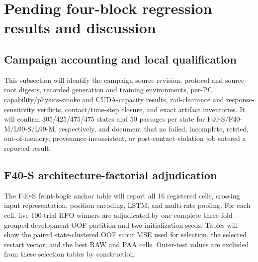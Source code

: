 \section{Pending four-block regression results and discussion}
\label{sec:results}


\subsection{Campaign accounting and local qualification}
\label{sec:accounting}

This subsection will identify the campaign source revision, protocol and
source-root digests, recorded generation and training environments, per-PC
capability/physics-smoke and CUDA-capacity results, rail-clearance and
response-sensitivity verdicts, contact/time-step closure, and exact artifact
inventories. It will
confirm 305/425/475/475 states and 50 passages per state for
F40-S/F40-M/L99-S/L99-M, respectively, and document that no failed, incomplete,
retried, out-of-memory, provenance-inconsistent, or post-contact-violation job
entered a reported result.

\subsection{F40-S architecture-factorial adjudication}
\label{sec:factorial_results}

The F40-S front-bogie anchor table will report all 16 registered cells,
crossing input representation, position encoding, LSTM, and multi-rate pooling. For each
cell, five 100-trial HPO winners are adjudicated by one complete three-fold
grouped-development OOF partition and two initialization seeds. Tables will
show the paired state-clustered OOF scour MSE used for selection, the selected
restart vector, and the best RAW and PAA cells. Outer-test values are excluded
from these selection tables by construction.

